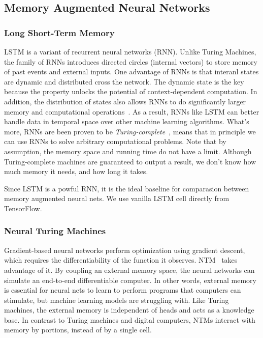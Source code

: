 \documentclass[12pt,twoside]{article}
\theoremstyle{plain}
\theoremstyle{definition}
\theoremstyle{remark}
\begin{document}
\subsection{Memory Augmented Neural Networks}
\subsubsection{Long Short-Term Memory}
LSTM is a variant of recurrent neural networks (RNN). Unlike Turing Machines, the family of RNNs introduces directed circles (internal vectors) to store memory of past events and external inputs.
One advantage of RNNs is that interanl states are dynamic and distributed cross the network. The dynamic state is the key because the property unlocks the potential of context-dependent computation. In addition, the distribution of states also allows RNNs to do significantly larger memory and computational operations~\cite{original-ntm}. As a result, RNNs like LSTM can better handle data in temporal space over other machine learning algorithms. What's more, RNNs are been proven to be \textit{Turing-complete}~\cite{RNNs-Turing-complete}, means that in principle we can use RNNs to solve arbitrary computational problems. Note that by assumption, the memory space and running time do not have a  limit. Although Turing-complete  machines are guaranteed to output a result, we don't know how much memory it needs, and how long it takes.

Since LSTM is a powful RNN, it is the ideal baseline for comparasion between memory augmented neural nets. We use vanilla LSTM cell directly from TensorFlow.
\subsubsection{Neural Turing Machines}
Gradient-based neural networks perform optimization using gradient descent, which requires the differentiability of the function it observes. NTM~\cite{original-ntm} takes advantage of it. By coupling an external memory space, the neural networks can simulate an end-to-end differentiable computer. In other words, external memory is essential for neural nets to learn to perform programs that computers can stimulate, but machine learning models are struggling with. Like Turing machines, the external memory is independent of heads and acts as a knowledge base. In contrast to Turing machines and digital computers, NTMs interact with memory by portions, instead of by a single cell.
\end{document}
